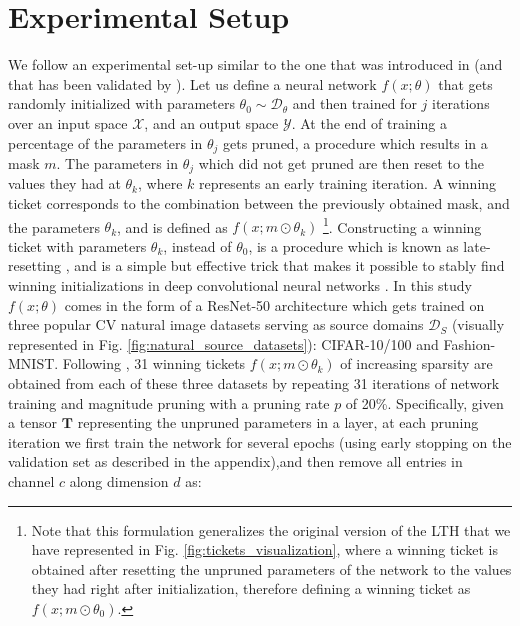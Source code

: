 \section{Experimental Setup}
\label{sec:experimental_setup}
We follow an experimental set-up similar to the one that was introduced in \cite{morcos2019one} (and that has been validated by \citet{gohil2019one}).
Let us define a neural network $f(x;\theta)$ that gets randomly initialized with parameters $\theta_0 \sim \mathcal{D}_{\theta}$ and then trained for $j$ iterations
over an input space $\mathcal{X}$, and an output space $\mathcal{Y}$. 
At the end of training a percentage of the parameters in $\theta_j$ gets pruned, a procedure which results in a mask $m$. The parameters in $\theta_j$ which did not get pruned are then reset to the values they had at $\theta_k$, where $k$ represents an early training iteration. A winning ticket corresponds to the combination between the previously obtained mask, and the parameters $\theta_k$, and is defined as $f(x;m\odot\theta_k)$ \footnote{Note that this formulation generalizes the original version of the LTH \cite{frankle2018lottery} that we have represented in Fig. \ref{fig:tickets_visualization}, where a winning ticket is obtained after resetting the unpruned parameters of the network to the values they had right after initialization, therefore defining a winning ticket as $f(x;m\odot\theta_0)$.}. Constructing a winning ticket with parameters $\theta_k$, instead of $\theta_0$, is a procedure which is known as late-resetting \cite{franklestabilizing}, and is a simple but effective trick that makes it possible to stably find winning initializations in deep convolutional neural networks \cite{franklestabilizing,morcos2019one}. In this study $f(x;\theta)$ comes in the form of a ResNet-50 architecture \cite{han2015deep} which gets trained on three popular CV natural image datasets serving as source domains $\mathcal{D}_S$ (visually represented in Fig. \ref{fig:natural_source_datasets}): CIFAR-10/100 and Fashion-MNIST. Following \cite{han2015deep,morcos2019one}, 31 winning tickets $f(x;m\odot\theta_k)$ of increasing sparsity are obtained from each of these three datasets by repeating 31 iterations of network training and magnitude pruning with a pruning rate $p$ of 20\%. Specifically, given a tensor $\mathbf{T}$ representing the unpruned parameters in a layer, at each pruning iteration we first train the network for several epochs (using early stopping on the validation set as described in the appendix),and then remove all entries in channel $c$ along dimension $d$ as:
